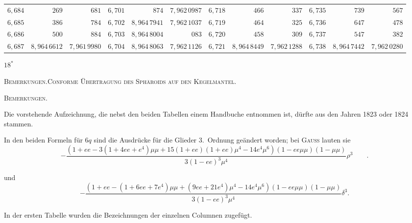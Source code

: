\begin{center}
\begin{tabular}{|r|r|r||r|r|r||r|r|r||r|r|r|}
$6{,}684$&$269$&$681$&$6{,}701$&$874$&$7{,}962\,0987$&$6{,}718$&$466$&$337$&$6{,}735$&$739$&$567$\\
$6{,}685$&$386$&$784$&$6{,}702$&$8{,}964\,7941$&$7{,}962\,1037$&$6{,}719$&$464$&$325$&$6{,}736$&$647$&$478$\\
$6{,}686$&$500$&$884$&$6{,}703$&$8{,}964\,8004$&$083$&$6{,}720$&$458$&$309$&$6{,}737$&$547$&$382$\\
$6{,}687$&$8{,}964\,6612$&$7{,}961\,9980$&$6{,}704$&$8{,}964\,8063$&$7{,}962\,1126$&$6{,}721$&$8{,}964\,8449$&$7{,}962\,1288$&$6{,}738$&$8{,}964\,7442$&$7{,}962\,0280$\\
\end{tabular}\par\endgroup
\end{center}
\vfill\hfill$18^*$\hspace*{2cm}\par
\clearpage
{}\hfill{\footnotesize\textsc{Bemerkungen.\quad Conforme Übertragung des Sphäroids auf den Kegelmantel.}}\par\bigskip
\begin{center}\textsc{Bemerkungen.}\end{center}
\begingroup\small
Die vorstehende Aufzeichnung, die nebst den beiden Tabellen einem Handbuche entnommen ist, dürfte aus den Jahren 1823 oder 1824 stammen.

In den beiden Formeln für $6q$ sind die Ausdrücke für die Glieder 3.~Ordnung geändert worden; bei \textsc{Gauss} lauten sie
\begingroup\footnotesize
\[
-\frac{(1+ee-3(1+4ee+e^4)\mu\mu+15(1+ee)(1+ee)\mu^4-14e^4\mu^6)(1-ee\mu\mu)(1-\mu\mu)}{3(1-ee)^3\mu^4}\rho^3\qquad .
\]
\par\endgroup
und
\begingroup\footnotesize
\[
-\frac{(1+ee-(1+6ee+7e^4)\mu\mu+(9ee+21e^4)\mu^4-14e^4\mu^6)(1-ee\mu\mu)(1-\mu\mu)}{3(1-ee)^3\mu^4}\delta^3.
\]
\par\endgroup
In der ersten Tabelle wurden die Bezeichnungen der einzelnen Columnen zugefügt.

